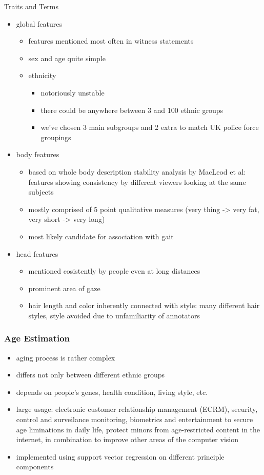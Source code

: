 \documentclass[paper=a4, fontsize=11pt]{scrartcl} %
\numberwithin{equation}{section} %
\numberwithin{figure}{section} %
\numberwithin{table}{section} %
\begin{document}
Traits and Terms
\begin{itemize}
\item global features
\begin{itemize}
\item features mentioned most often in witness statements
\item sex and age quite simple
\item ethnicity
\begin{itemize}
\item notoriously unstable
\item there could be anywhere between 3 and 100 ethnic groups
\item we've chosen 3 main subgroups and 2 extra to match UK police force groupings
\end{itemize}
\end{itemize}
\item body features
\begin{itemize}
\item based on whole body description stability analysis by MacLeod et al: features showing consistency by different viewers looking at the same subjects
\item mostly comprised of 5 point qualitative measures (very thing -> very fat, very short -> very long)
\item most likely candidate for association with gait
\end{itemize}
\item head features
\begin{itemize}
\item mentioned cosistently by people even at long distances
\item prominent area of gaze
\item hair length and color inherently connected with style: many different hair styles, style avoided due to unfamiliarity of annotators
\end{itemize}
\end{itemize}

\subsubsection{Age Estimation}

\begin{itemize}
\item aging process is rather complex
\item differs not only between different ethnic groups
\item depends on people's genes, health condition, living style, etc.
\item large usage: electronic customer relationship management (ECRM), security, control and surveilance monitoring, biometrics and entertainment to secure age liminations in daily life, protect minors from age-restricted content in the internet, in combination to improve other areas of the computer vision
\item implemented using support vector regression on different principle components
\end{itemize}
\end{document}
